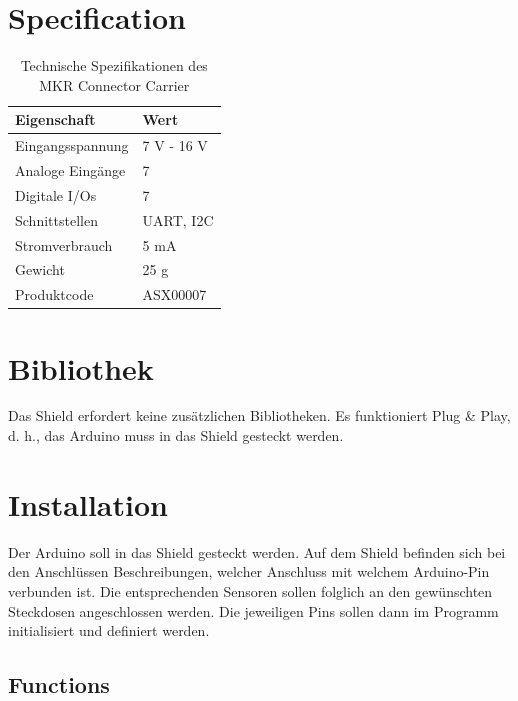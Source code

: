 \section{Specification}

	\begin{table}[H]
		\centering
		\begin{tabular}{|l|l|}
			\hline
			\textbf{Eigenschaft} & \textbf{Wert} \\
			\hline
			Eingangsspannung & 7 V - 16 V \\
			\hline
			Analoge Eingänge & 7 \\
			\hline
			Digitale I/Os & 7 \\
			\hline
			Schnittstellen & UART, I2C \\
			\hline
			Stromverbrauch & 5 mA \\
			\hline
			Gewicht & 25 g \\
			\hline
			Produktcode & ASX00007 \\
			\hline
		\end{tabular}
		\caption{Technische Spezifikationen des MKR Connector Carrier}
	\end{table}
	
\section{Bibliothek}
	Das Shield erfordert keine zusätzlichen Bibliotheken. Es funktioniert Plug \& Play, d. h., das Arduino muss in das Shield gesteckt werden.

\section{Installation}
	Der Arduino soll in das Shield gesteckt werden. Auf dem Shield befinden sich bei den Anschlüssen Beschreibungen, welcher Anschluss mit welchem Arduino-Pin verbunden ist. Die entsprechenden Sensoren sollen folglich an den gewünschten Steckdosen angeschlossen werden. Die jeweiligen Pins sollen dann im Programm initialisiert und definiert werden.

\subsection{Functions}


